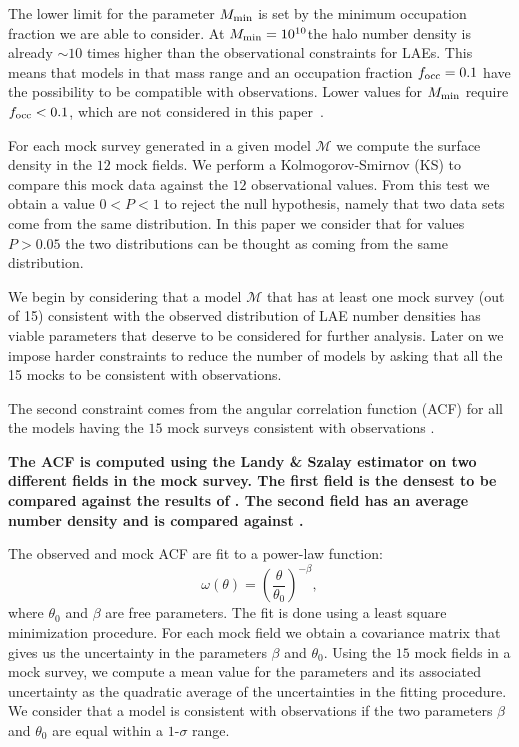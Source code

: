 \documentclass[usenatbib]{mn2e}
\newcommand{\documentname}{paper~}
\newcommand{\hMsun}{{\ifmmode{h^{-1}{\rm
        {M_{\odot}}}}\else{$h^{-1}{\rm{M_{\odot}}}$}\fi}}
\begin{document}
{The lower limit for the parameter $M_{\rm min}$ is set by the minimum
occupation fraction we are able to consider. At $M_{\rm
  min}=10^{10}$\hMsun the halo number density is already $\sim 10$
times higher than the observational constraints for LAEs. This means
that models in that mass range and an occupation fraction $f_{\rm
  occ}=0.1$ have the possibility to be compatible with observations. Lower
values for $M_{\rm min}$ require $f_{\rm occ}<0.1$, which are not
considered in this \documentname. 

For each mock survey generated in a given model ${\mathcal M}$ we
compute the surface density in the $12$ mock fields. We perform a
Kolmogorov-Smirnov (KS) to compare this mock data against the $12$
observational values. From this test we obtain a value $0<P<1$ to
reject the null hypothesis, namely that two data sets come from the
same distribution. In this paper we consider that for values $P>0.05$
the two distributions can be thought as coming from the same
distribution.

We begin by considering that  a model ${\mathcal M}$ that has at least
one mock survey (out of 15) consistent with the observed
distribution of LAE number densities has viable parameters that
deserve to be considered for further analysis. Later on we impose
harder constraints to reduce the number of models by asking that all
the 15 mocks to be consistent with observations.

The second constraint  comes from the angular correlation function (ACF)
for all the models having the $15$ mock surveys consistent with
observations . 

{\bf The ACF is computed using  the Landy \&  Szalay estimator
  \citep{Landy1993}  on two different  fields in the mock survey. The
  first field is the densest to be compared against the results of
  \cite{Hayashino2004}. The second field has an average number density and is compared against \cite{Ouchi2010}.}

The observed and mock ACF are fit to a power-law function:
\begin{equation}
\omega(\theta) = \left(\frac{\theta}{\theta_{0}}\right)^{-\beta}, 
\label{eq:fitting}
\end{equation}
where $\theta_0$ and $\beta$ are free parameters. The fit is done
using a least square minimization procedure. For each mock field we obtain a
covariance matrix that gives us the uncertainty in the parameters $\beta$ and
$\theta_0$. Using the $15$ mock fields in a mock survey, we compute a
mean value for the parameters and its associated uncertainty as the
quadratic average of the uncertainties in the fitting procedure. We
consider that a model is consistent with observations if the two
parameters $\beta$ and $\theta_0$ are equal within a $1$-$\sigma$
range.   



}
\end{document}
